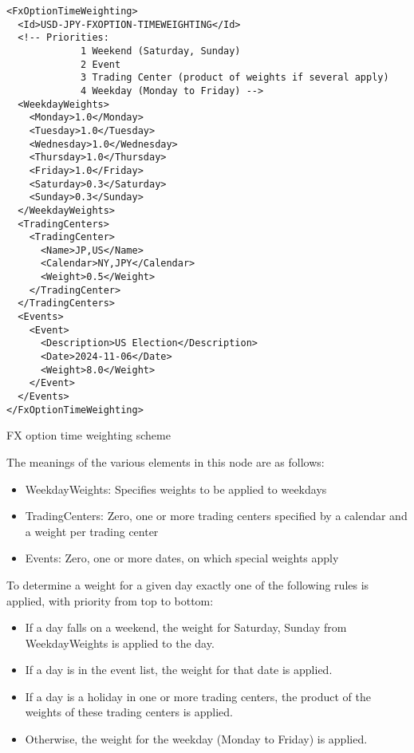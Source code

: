 \begin{listing}[H]
\begin{verbatim}
<FxOptionTimeWeighting>
  <Id>USD-JPY-FXOPTION-TIMEWEIGHTING</Id>
  <!-- Priorities:
             1 Weekend (Saturday, Sunday)
             2 Event
             3 Trading Center (product of weights if several apply)
             4 Weekday (Monday to Friday) -->
  <WeekdayWeights>
    <Monday>1.0</Monday>
    <Tuesday>1.0</Tuesday>
    <Wednesday>1.0</Wednesday>
    <Thursday>1.0</Thursday>
    <Friday>1.0</Friday>
    <Saturday>0.3</Saturday>
    <Sunday>0.3</Sunday>
  </WeekdayWeights>
  <TradingCenters>
    <TradingCenter>
      <Name>JP,US</Name>
      <Calendar>NY,JPY</Calendar>
      <Weight>0.5</Weight>
    </TradingCenter>
  </TradingCenters>
  <Events>
    <Event>
      <Description>US Election</Description>
      <Date>2024-11-06</Date>
      <Weight>8.0</Weight>
    </Event>
  </Events>
</FxOptionTimeWeighting>
\end{verbatim}
\caption{FX option time weighting scheme}
\label{lst:fx_option_timeweighting}
\end{listing}


The meanings of the various elements in this node are as follows:
\begin{itemize}
\item WeekdayWeights: Specifies weights to be applied to weekdays
\item TradingCenters: Zero, one or more trading centers specified by a calendar and a weight per trading center
\item Events: Zero, one or more dates, on which special weights apply
\end{itemize}

To determine a weight for a given day exactly one of the following rules is applied, with priority from top to bottom:

\begin{itemize}
\item If a day falls on a weekend, the weight for Saturday, Sunday from WeekdayWeights is applied to the day.
\item If a day is in the event list, the weight for that date is applied.
\item If a day is a holiday in one or more trading centers, the product of the weights of these trading centers is applied.
\item Otherwise, the weight for the weekday (Monday to Friday) is applied.
\end{itemize}

